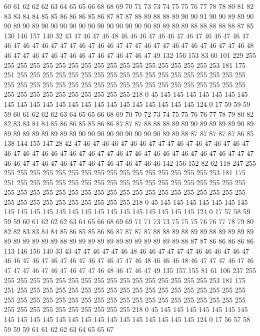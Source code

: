 60 61 62 62 62 63 64 65 65 66 68 68 69 70 71 73 73 74 75 75
76 77 78 78 80 81 82 83 83 84 84 85 85 86 86 86 85 86 87 87
87 88 89 88 88 89 90 90 91 90 90 89 89 90 90 89 90 89 90 90
90 90 90 90 90 90 90 90 90 90 89 89 89 89 88 88 88 88 88 87
85 130 146 157 140 32 43 47 46 47 46 48 46 46 46 47 46 46 47 46
47 46 46 47 46 47 46 47 46 47 46 47 47 47 46 47 46 46 47 47
47 46 47 47 46 47 46 47 46 47 47 46 48 46 47 47 46 47 46 47
46 46 47 46 47 46 47 46 47 49 132 156 153 83 60 101 229 255 255 255
255 255 255 255 255 255 255 255 255 255 255 255 255 255 253 181 175 251 255 255
255 255 255 255 255 255 255 255 255 255 255 255 255 255 255 255 255 255 255 255
255 255 255 255 255 255 255 255 255 255 255 255 255 255 255 255 255 255 255 255
255 255 255 255 255 218 0 45 145 145 145 145 145 145 145 145 145 145 145 145
145 145 145 145 145 145 145 145 145 145 124 0 17 59 59 59 59 60 61 62
62 62 63 64 65 65 66 68 69 70 70 72 73 74 75 75 76 76 77 78
79 80 82 82 83 83 84 84 85 86 86 85 85 86 86 87 87 87 88 88
88 89 89 90 89 89 89 89 90 89 89 89 89 89 89 89 89 89 90 90
90 90 90 90 90 90 90 89 89 88 87 87 87 87 87 86 85 138 144 155
147 28 42 47 46 47 46 46 47 46 46 47 47 47 46 47 46 47 46 47
46 47 46 47 46 47 46 46 47 46 47 46 47 47 46 47 46 47 46 46
47 46 47 46 47 46 47 47 47 46 46 47 47 46 47 46 47 47 46 47
46 47 46 47 46 46 142 156 152 82 62 118 247 255 255 255 255 255 255 255
255 255 255 255 255 255 255 255 255 255 253 181 175 251 255 255 255 255 255 255
255 255 255 255 255 255 255 255 255 255 255 255 255 255 255 255 255 255 255 255
255 255 255 255 255 255 255 255 255 255 255 255 255 255 255 255 255 255 255 255
255 218 0 45 145 145 145 145 145 145 145 145 145 145 145 145 145 145 145 145
145 145 145 145 145 145 124 0 17 57 58 59 59 59 60 61 62 62 62 63
64 65 66 68 69 69 71 71 73 73 75 75 75 76 76 77 78 79 80 82
82 83 83 84 84 85 86 85 85 86 86 87 87 87 87 88 88 89 88 89
89 88 89 89 89 89 89 89 89 89 89 89 88 89 89 89 89 89 89 89
89 89 89 89 89 88 87 87 86 86 86 86 86 113 146 156 140 33 43 47
47 46 47 47 46 48 46 46 47 47 47 47 46 46 46 47 46 47 46 46
47 46 47 46 47 46 47 46 47 46 47 47 46 48 46 46 46 48 46 47
47 47 46 47 46 47 47 47 46 47 46 47 46 47 47 46 48 46 47 46
47 49 135 157 155 81 61 106 237 255 255 255 255 255 255 255 255 255 255 255
255 255 255 255 255 255 253 181 175 251 255 255 255 255 255 255 255 255 255 255
255 255 255 255 255 255 255 255 255 255 255 255 255 255 255 255 255 255 255 255
255 255 255 255 255 255 255 255 255 255 255 255 255 255 255 255 255 218 0 45
145 145 145 145 145 145 145 145 145 145 145 145 145 145 145 145 145 145 145 145
145 145 124 0 17 56 57 58 59 59 59 61 61 62 62 63 64 65 65 67
